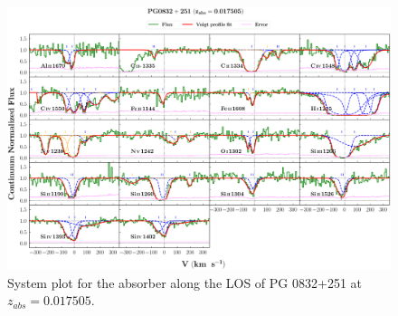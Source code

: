   
  \newpage
  \thispagestyle{empty}

  \begin{landscape}
  
  \begin{figure}
      \centering
      \vspace{-10mm}
      \hspace*{-20mm}
      \includegraphics[width=1.1\linewidth]{System-Plots/PG0832+251_z=0.017505_sys_plot.png}
      \caption{System plot for the absorber along the LOS of PG 0832+251 at $z_{abs} = 0.017505$. }
  \end{figure}
  
  \end{landscape}
  
